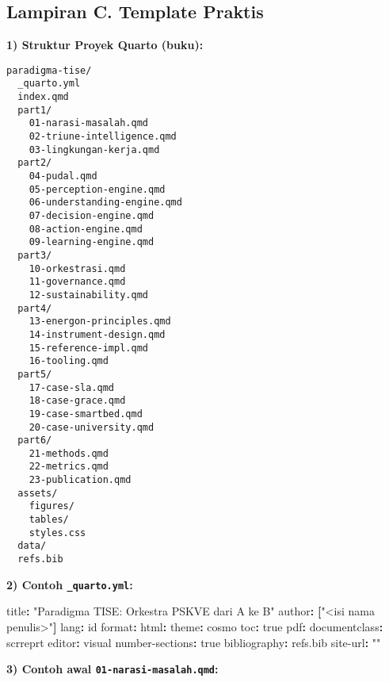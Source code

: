 \documentclass[
  letterpaper,
  DIV=11,
  numbers=noendperiod]{scrartcl}
\newenvironment{Shaded}{\begin{snugshade}}{\end{snugshade}}
\newcommand{\AttributeTok}[1]{\textcolor[rgb]{0.40,0.45,0.13}{#1}}
\newcommand{\CharTok}[1]{\textcolor[rgb]{0.13,0.47,0.30}{#1}}
\newcommand{\FunctionTok}[1]{\textcolor[rgb]{0.28,0.35,0.67}{#1}}
\newcommand{\KeywordTok}[1]{\textcolor[rgb]{0.00,0.23,0.31}{\textbf{#1}}}
\newcommand{\StringTok}[1]{\textcolor[rgb]{0.13,0.47,0.30}{#1}}
\begin{document}
\subsection{Lampiran C. Template
Praktis}\label{lampiran-c.-template-praktis}

\textbf{1) Struktur Proyek Quarto (buku):}

\begin{verbatim}
paradigma-tise/
  _quarto.yml
  index.qmd
  part1/
    01-narasi-masalah.qmd
    02-triune-intelligence.qmd
    03-lingkungan-kerja.qmd
  part2/
    04-pudal.qmd
    05-perception-engine.qmd
    06-understanding-engine.qmd
    07-decision-engine.qmd
    08-action-engine.qmd
    09-learning-engine.qmd
  part3/
    10-orkestrasi.qmd
    11-governance.qmd
    12-sustainability.qmd
  part4/
    13-energon-principles.qmd
    14-instrument-design.qmd
    15-reference-impl.qmd
    16-tooling.qmd
  part5/
    17-case-sla.qmd
    18-case-grace.qmd
    19-case-smartbed.qmd
    20-case-university.qmd
  part6/
    21-methods.qmd
    22-metrics.qmd
    23-publication.qmd
  assets/
    figures/
    tables/
    styles.css
  data/
  refs.bib
\end{verbatim}

\textbf{2) Contoh \texttt{\_quarto.yml}:}

\begin{Shaded}
\begin{Highlighting}[]
\FunctionTok{title}\KeywordTok{:}\AttributeTok{ }\StringTok{"Paradigma TISE: Orkestra PSKVE dari A ke B"}
\FunctionTok{author}\KeywordTok{:}\AttributeTok{ }\KeywordTok{[}\StringTok{"\textless{}isi nama penulis\textgreater{}"}\KeywordTok{]}
\FunctionTok{lang}\KeywordTok{:}\AttributeTok{ id}
\FunctionTok{format}\KeywordTok{:}
\AttributeTok{  }\FunctionTok{html}\KeywordTok{:}
\AttributeTok{    }\FunctionTok{theme}\KeywordTok{:}\AttributeTok{ cosmo}
\AttributeTok{    }\FunctionTok{toc}\KeywordTok{:}\AttributeTok{ }\CharTok{true}
\AttributeTok{  }\FunctionTok{pdf}\KeywordTok{:}
\AttributeTok{    }\FunctionTok{documentclass}\KeywordTok{:}\AttributeTok{ scrreprt}
\FunctionTok{editor}\KeywordTok{:}\AttributeTok{ visual}
\FunctionTok{number{-}sections}\KeywordTok{:}\AttributeTok{ }\CharTok{true}
\FunctionTok{bibliography}\KeywordTok{:}\AttributeTok{ refs.bib}
\FunctionTok{site{-}url}\KeywordTok{:}\AttributeTok{ }\StringTok{""}
\end{Highlighting}
\end{Shaded}

\textbf{3) Contoh awal \texttt{01-narasi-masalah.qmd}:}
\end{document}
